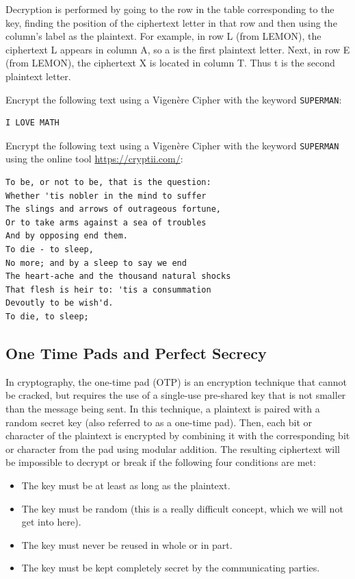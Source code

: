 \documentclass[11pt,a4paper]{report}
\begin{document}
Decryption is performed by going to the row in the table corresponding to the key, finding the position of the ciphertext letter in that row and then using the column's label as the plaintext.
For example, in row L (from LEMON), the ciphertext L appears in column A, so a is the first plaintext letter.
Next, in row E (from LEMON), the ciphertext X is located in column T. Thus t is the second plaintext letter.
\begin{ex}
Encrypt the following text using a Vigenère Cipher with the keyword \verb|SUPERMAN|:
\begin{verbatim}
I LOVE MATH
\end{verbatim}

\end{ex}

\begin{ex}
Encrypt the following text using a Vigenère Cipher with the keyword \verb|SUPERMAN|
using the online tool \url{https://cryptii.com/}:
\begin{verbatim}
To be, or not to be, that is the question:
Whether 'tis nobler in the mind to suffer
The slings and arrows of outrageous fortune,
Or to take arms against a sea of troubles
And by opposing end them.
To die - to sleep,
No more; and by a sleep to say we end
The heart-ache and the thousand natural shocks
That flesh is heir to: 'tis a consummation
Devoutly to be wish'd.
To die, to sleep;
\end{verbatim}
\end{ex}


\subsection{One Time Pads and Perfect Secrecy}


In cryptography, the one-time pad (OTP) is an encryption technique that cannot be cracked, but requires the use of a single-use pre-shared key that is not smaller than the message being sent.
In this technique, a plaintext is paired with a random secret key (also referred to as a one-time pad).
Then, each bit or character of the plaintext is encrypted by combining it with the corresponding bit or character from the pad using modular addition.
The resulting ciphertext will be impossible to decrypt or break if the following four conditions are met:
\begin{itemize}
\item The key must be at least as long as the plaintext.
\item The key must be random (this is a really difficult concept, which we will not get into here).
\item The key must never be reused in whole or in part.
\item The key must be kept completely secret by the communicating parties.
\end{itemize}
\end{document}
